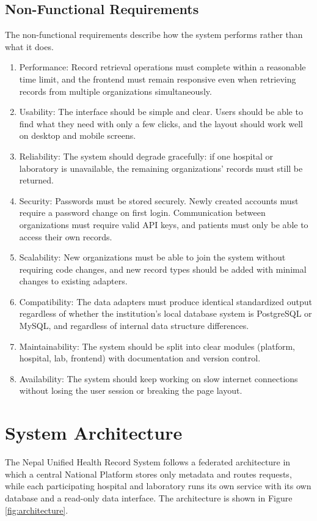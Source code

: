 \documentclass[12pt]{report}
\numberwithin{equation}{chapter}
\begin{document}
\subsection{Non-Functional Requirements}
The non-functional requirements describe how the system performs rather than what it does.
\begin{enumerate}
    \item Performance: Record retrieval operations must complete within a reasonable time limit, and the frontend must remain responsive even when retrieving records from multiple organizations simultaneously.
    \item Usability: The interface should be simple and clear. Users should be able to find what they need with only a few clicks, and the layout should work well on desktop and mobile screens.
    \item Reliability: The system should degrade gracefully: if one hospital or laboratory is unavailable, the remaining organizations' records must still be returned.
    \item Security: Passwords must be stored securely. Newly created accounts must require a password change on first login. Communication between organizations must require valid API keys, and patients must only be able to access their own records.
    \item Scalability: New organizations must be able to join the system without requiring code changes, and new record types should be added with minimal changes to existing adapters.
    \item Compatibility: The data adapters must produce identical standardized output regardless of whether the institution's local database system is PostgreSQL or MySQL, and regardless of internal data structure differences.
    \item Maintainability: The system should be split into clear modules (platform, hospital, lab, frontend) with documentation and version control.
    \item Availability: The system should keep working on slow internet connections without losing the user session or breaking the page layout.
\end{enumerate}

\section{System Architecture}
The Nepal Unified Health Record System follows a federated architecture in which a central National Platform stores only metadata and routes requests, while each participating hospital and laboratory runs its own service with its own database and a read-only data interface. The architecture is shown in Figure \ref{fig:architecture}.
\end{document}
